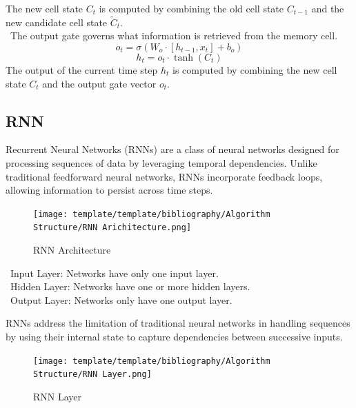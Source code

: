 \documentclass{ieeeojies}
\begin{document}
The new cell state \( C_t \) is computed by combining the old cell state \(   C_{t-1} \) and the new candidate cell state \( \tilde{C}_t \). \\
 \indent\textbullet\ The output gate governs what information is retrieved from the memory cell. \\
 \begin{equation}
    o_t = \sigma(W_o \cdot [h_{t-1}, x_t] + b_o)
\end{equation}
\begin{equation}
    h_t = o_t \cdot \tanh(C_t)
\end{equation}
The output of the current time step \( h_t \) is computed by combining the new cell state \( C_t \) and the output gate vector \( o_t \).

\subsection{RNN}

Recurrent Neural Networks (RNNs) are a class of neural networks designed for processing sequences of data by leveraging temporal dependencies. Unlike traditional feedforward neural networks, RNNs incorporate feedback loops, allowing information to persist across time steps.\\

\begin{figure}[H]
    \centering
    \texttt{[image: template/template/bibliography/Algorithm Structure/RNN Arichitecture.png]}
    \caption{RNN Architecture}
    \label{fig:1}
\end{figure}
    \indent\textbullet\ Input Layer: Networks have only one input layer.\\
    \indent\textbullet\ Hidden Layer: Networks  have one or more hidden layers.\\
    \indent\textbullet\ Output Layer: Networks only have one output layer.

RNNs address the limitation of traditional neural networks in handling sequences by using their internal state to capture dependencies between successive inputs.\\

\begin{figure}[H]
    \centering
    \texttt{[image: template/template/bibliography/Algorithm Structure/RNN Layer.png]}
    \caption{RNN Layer}
    \label{fig:1}
\end{figure}
\end{document}
